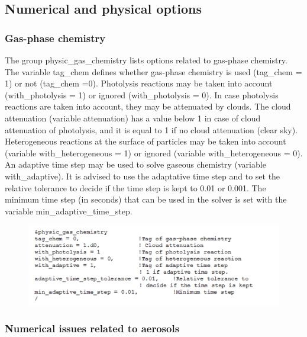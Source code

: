 \documentclass[a4paper,11pt]{article}
\begin{document}
\subsection{Numerical and physical options}

\subsubsection{Gas-phase chemistry}

The group physic\_gas\_chemistry lists options related to gas-phase chemistry. 
The variable tag\_chem defines whether gas-phase chemistry is used (tag\_chem = 1) or not (tag\_chem =0). 
Photolysis reactions may be taken into account (with\_photolysis = 1) or ignored (with\_photolysis = 0). In case photolysis reactions are taken into account, they may be attenuated by clouds. The cloud attenuation (variable attenuation) has a value below 1 in case of cloud attenuation of photolysis, and it is equal to 1 if no cloud attenuation (clear sky).
Heterogeneous reactions at the surface of particles may be taken into account (variable with\_heterogeneous = 1) or ignored (variable with\_heterogeneous = 0). An adaptive time step may be used to solve gaseous chemistry (variable with\_adaptive). It is advised to use the adaptative time step and to set the relative tolerance to decide if the time step is kept to 0.01 or 0.001. The minimum time step (in seconds) that can be used in the solver is set with the variable min\_adaptive\_time\_step.

\begin{figure}[H]
        \begin{center}
                \includegraphics[angle=0,width=\textwidth]{fig/gaschemistry.png}
        \end{center}
\end{figure}

\subsubsection{Numerical issues related to aerosols}
\end{document}
